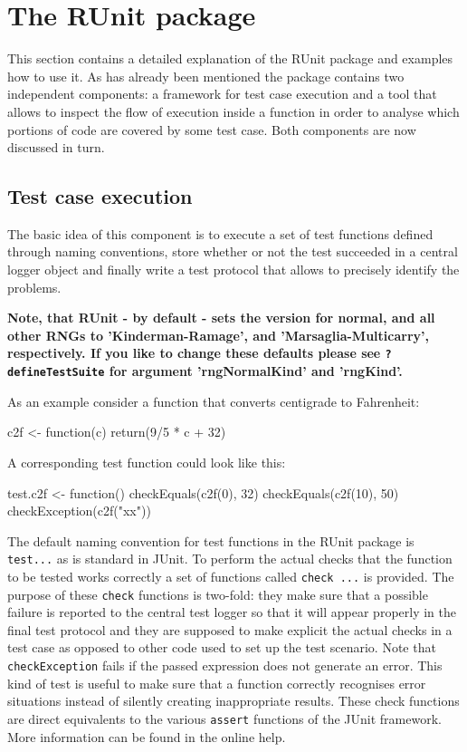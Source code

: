 \documentclass[12pt, a4paper]{article}
\begin{document}
\section{The RUnit package}
\label{section:RUnitPackage}
This section contains a detailed explanation of the RUnit package and
examples how to use it. As has already been mentioned the package
contains two independent components: a framework for test case
execution and a tool that allows to inspect the flow of execution
inside a function in order to analyse which portions of code are
covered by some test case.
Both components are now discussed in turn.

\subsection{Test case execution}
\label{subsection:Testcaseexecution}
The basic idea of this component is to execute a set of test functions
defined through naming conventions, store whether or not the test
succeeded in a central logger object and finally write a test protocol
that allows to precisely identify the problems.

{\bf Note, that RUnit - by default - sets the version for normal, and all other RNGs to 'Kinderman-Ramage', and 'Marsaglia-Multicarry', respectively. If you like to change these defaults please see {\tt ?defineTestSuite} for argument 'rngNormalKind' and 'rngKind'.}

As an example consider a function that converts centigrade to
Fahrenheit:
\begin{Sinput}
c2f <- function(c) return(9/5 * c + 32)
\end{Sinput}
A corresponding test function could look like this:
\begin{Sinput}
test.c2f <- function() {
  checkEquals(c2f(0), 32)
  checkEquals(c2f(10), 50)
  checkException(c2f("xx"))
}
\end{Sinput}
The default naming convention for test functions in the RUnit package is {\tt test...} as is standard in JUnit. To perform the actual checks that the function to be tested works correctly a set of functions called {\tt check ...} is provided. The purpose of these {\tt check} functions is two-fold: they make sure that a possible failure is reported to the central test logger so that it will appear properly in the final test protocol and they are supposed to make explicit the actual checks in a test case as opposed to other code used to set up the test scenario. Note that {\tt checkException} fails if the passed expression does not generate an error. This kind of test is useful to make sure that a function correctly recognises error situations instead of silently creating inappropriate results. These check functions are direct equivalents to the various {\tt assert} functions of the JUnit framework. More information can be found in the online help.
\end{document}
